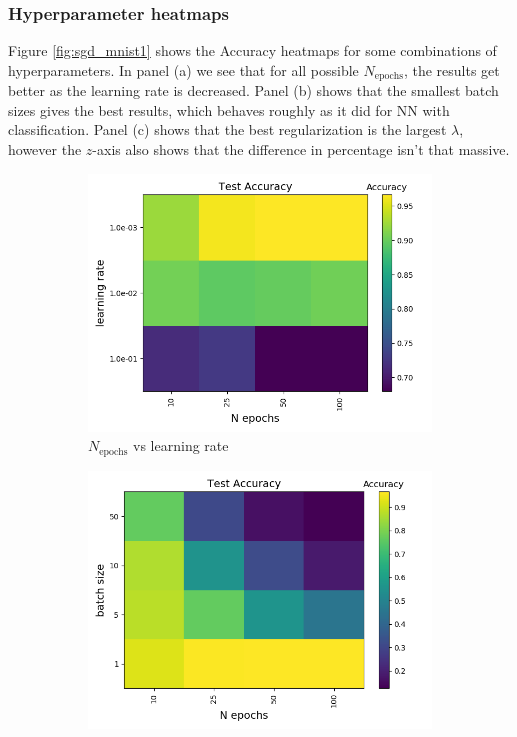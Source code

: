 \documentclass[a4paper]{article}
\newcommand{\Nepochs}{N_{\text{epochs}}}
\begin{document}
\subsubsection*{Hyperparameter heatmaps}
Figure \ref{fig:sgd_mnist1} shows the Accuracy heatmaps for some combinations of hyperparameters. In panel (a) we see that for all possible $\Nepochs$, the results get better as the learning rate is decreased. Panel (b) shows that the smallest batch sizes gives the best results, which behaves roughly as it did for NN with classification. Panel (c) shows that the best regularization is the largest $\lambda$, however the $z$-axis also shows that the difference in percentage isn't that massive.
\begin{figure}[H]
  \centering
  \begin{subfigure}{0.49\textwidth}
    \includegraphics[scale=0.45]{../figures/task_e/test/heatmap_test_lr_constant_Nhyp4434_Accuracy_n_epochs_eta0.png}
    \caption{$\Nepochs$ vs learning rate}
  \end{subfigure}
  \begin{subfigure}{0.49\textwidth}
    \includegraphics[scale=0.45]{../figures/task_e/test/heatmap_test_lr_constant_Nhyp4434_Accuracy_n_epochs_bsize.png}

\end{subfigure}
\end{figure}
\end{document}
